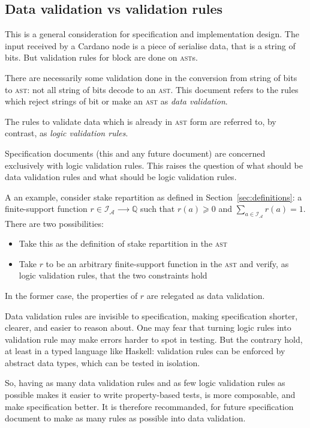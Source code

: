 \documentclass{article}
\newcommand{\idsof}[1]{\mathcal{I}\!_#1}
\newcommand{\agentids}{\idsof{\mathcal{A}}}
\begin{document}
\subsection{Data validation vs validation rules}
\label{sec:data-validation-vs}

This is a general consideration for specification and implementation
design. The input received by a Cardano node is a piece of serialise
data, that is a string of bits. But validation rules for block are
done on \textsc{ast}s.

There are necessarily some validation done in the conversion from
string of bits to \textsc{ast}: not all string of bits decode to an
\textsc{ast}. This document refers to the rules which reject strings
of bit or make an \textsc{ast} as \emph{data validation}.

The rules to validate data which is already in \textsc{ast} form are
referred to, by contrast, as \emph{logic validation rules}.

Specification documents (this and any future document) are concerned
exclusively with logic validation rules. This raises the
question of what should be data validation rules and what should be
logic validation rules.

A an example, consider stake repartition as defined in
Section~\ref{sec:definitions}: a finite-support function $r∈\agentids
⟶ \mathbb{Q}$ such that $r(a) ⩾ 0$ and $∑_{a∈\agentids} r(a) =
1$. There are two possibilities:
\begin{itemize}
\item Take this as the definition of stake repartition in the
  \textsc{ast}
\item Take $r$ to be an arbitrary finite-support function in the
  \textsc{ast} and verify, as logic validation rules, that the two
  constraints hold
\end{itemize}
In the former case, the properties of $r$ are relegated as data
validation.

Data validation rules are invisible to specification, making
specification shorter, clearer, and easier to reason about. One may
fear that turning logic rules into validation rule may make errors
harder to spot in testing. But the contrary hold, at least in a typed
language like Haskell: validation rules can be enforced by abstract
data types, which can be tested in isolation.

So, having as many data validation rules and as few logic validation
rules as possible makes it easier to write property-based tests, is
more composable, and make specification better. It is therefore
recommanded, for future specification document to make as many rules
as possible into data validation.
\end{document}
